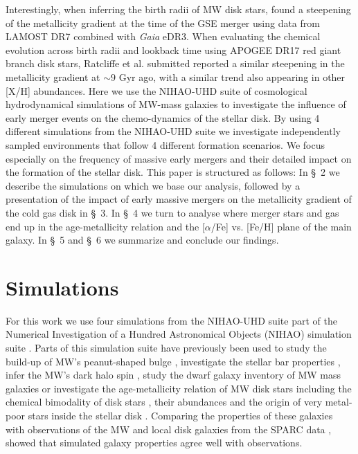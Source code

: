 \documentclass[useAMS,usenatbib]{mnras}
\begin{document}
Interestingly, when inferring the birth radii of MW disk stars, \citet{Lu2022b} found a steepening of the metallicity gradient at the time of the GSE merger using data from LAMOST DR7 combined with {\it Gaia} eDR3. When evaluating the chemical evolution across birth radii and lookback time using APOGEE DR17 red giant branch disk stars, Ratcliffe et al. submitted reported a similar steepening in the metallicity gradient at $\sim9$ Gyr ago, with a similar trend also appearing in other [X/H] abundances. Here we use the NIHAO-UHD suite of cosmological hydrodynamical simulations of MW-mass galaxies \citep{Buck2020a} %
to investigate the influence of early merger events on the chemo-dynamics of the stellar disk. By using 4 different simulations from the NIHAO-UHD suite we investigate independently sampled environments that follow 4 different formation scenarios. We focus especially on the frequency of massive early mergers and their detailed impact on the formation of the stellar disk. This paper is structured as follows: In \S~2 we describe the simulations on which we base our analysis, followed by a presentation of the impact of early massive mergers on the metallicity gradient of the cold gas disk in \S~3. In \S~4 we turn to analyse where merger stars and gas end up in the age-metallicity relation  and the [$\alpha$/Fe] vs. [Fe/H] plane of the main galaxy. In \S~5 and \S~6 we summarize and conclude our findings.


\section{Simulations} \label{sec:simulation}

For this work we use four simulations from the NIHAO-UHD suite \citep{Buck2020a} part of the Numerical Investigation of a Hundred Astronomical Objects (NIHAO) simulation suite \citep{Wang2015}. Parts of this simulation suite have previously been used to study the build-up of MW's peanut-shaped bulge \citep{Buck2018,Buck2019}, investigate the stellar bar properties \citep{Hilmi2020}, infer the MW's dark halo spin \citep{Obreja2022}, study the dwarf galaxy inventory of MW mass galaxies \citep{Buck2019a} or investigate the age-metallicity relation of MW disk stars \citep{Lu2022} including the chemical bimodality of disk stars \citep{Buck2020}, their abundances \citep{Lu2022a} and the origin of very metal-poor stars inside the stellar disk \citep{Sestito2021}.
Comparing the properties of these galaxies with observations of the MW and local disk galaxies from the SPARC data \citep{Lelli2016}, \citet{Buck2020a} showed that simulated galaxy properties agree well with observations.
\end{document}
